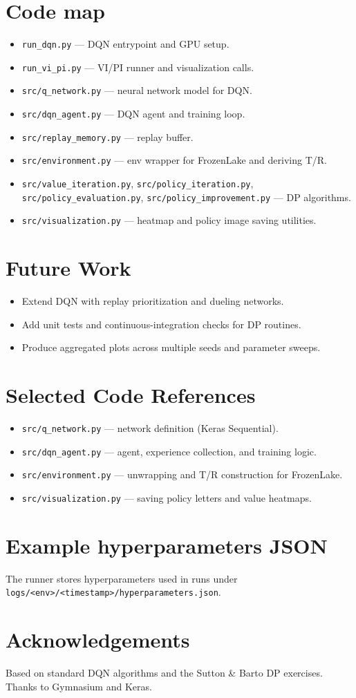 \documentclass[11pt]{article}
\begin{document}
\section{Code map}
\begin{itemize}
  \item \texttt{run\_dqn.py} — DQN entrypoint and GPU setup.
  \item \texttt{run\_vi\_pi.py} — VI/PI runner and visualization calls.
  \item \texttt{src/q\_network.py} — neural network model for DQN.
  \item \texttt{src/dqn\_agent.py} — DQN agent and training loop.
  \item \texttt{src/replay\_memory.py} — replay buffer.
  \item \texttt{src/environment.py} — env wrapper for FrozenLake and deriving T/R.
  \item \texttt{src/value\_iteration.py}, \texttt{src/policy\_iteration.py}, \texttt{src/policy\_evaluation.py}, \texttt{src/policy\_improvement.py} — DP algorithms.
  \item \texttt{src/visualization.py} — heatmap and policy image saving utilities.
\end{itemize}

\section{Future Work}
\begin{itemize}
  \item Extend DQN with replay prioritization and dueling networks.
  \item Add unit tests and continuous-integration checks for DP routines.
  \item Produce aggregated plots across multiple seeds and parameter sweeps.
\end{itemize}

\appendix
\section{Selected Code References}
\begin{itemize}
  \item \texttt{src/q\_network.py} — network definition (Keras Sequential).
  \item \texttt{src/dqn\_agent.py} — agent, experience collection, and training logic.
  \item \texttt{src/environment.py} — unwrapping and T/R construction for FrozenLake.
  \item \texttt{src/visualization.py} — saving policy letters and value heatmaps.
\end{itemize}

\section{Example hyperparameters JSON}
The runner stores hyperparameters used in runs under \texttt{logs/<env>/<timestamp>/hyperparameters.json}.

\section{Acknowledgements}
Based on standard DQN algorithms and the Sutton \& Barto DP exercises. Thanks to Gymnasium and Keras.
\end{document}

